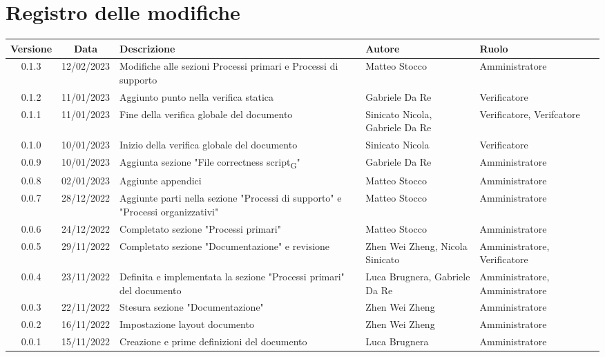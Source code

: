 \section*{Registro delle modifiche}
\begin{center}
\renewcommand\tabularxcolumn[1]{>{\Centering}m{#1}}
\begin{tabularx}{\textwidth}{| c | c | X | X | X |} 
\hline
 \textbf{Versione} & \textbf{Data} & \textbf{Descrizione} & \textbf{Autore} & \textbf{Ruolo}\\
 \hline
 0.1.3 & 12/02/2023 & Modifiche alle sezioni Processi primari e Processi di supporto & Matteo Stocco & Amministratore\\
 \hline
 0.1.2 & 11/01/2023 & Aggiunto punto nella verifica statica & Gabriele Da Re & Verificatore\\
 \hline
 0.1.1 & 11/01/2023 & Fine della verifica globale del documento & Sinicato Nicola, Gabriele Da Re & Verificatore, Verifcatore\\
 \hline
 0.1.0 & 10/01/2023 & Inizio della verifica globale del documento & Sinicato Nicola & Verificatore\\
 \hline
 0.0.9 & 10/01/2023 & Aggiunta sezione "File correctness script\textsubscript{G}" & Gabriele Da Re & Amministratore\\
 \hline
 0.0.8 & 02/01/2023 & Aggiunte appendici & Matteo Stocco & Amministratore\\
 \hline
 0.0.7 & 28/12/2022 & Aggiunte parti nella sezione "Processi di supporto" e "Processi organizzativi" & Matteo Stocco & Amministratore\\
 \hline
 0.0.6 & 24/12/2022 & Completato sezione "Processi primari" & Matteo Stocco & Amministratore\\
 \hline
 0.0.5 & 29/11/2022 & Completato sezione "Documentazione" e revisione & Zhen Wei Zheng, Nicola Sinicato & Amministratore, Verificatore\\
 \hline
 0.0.4 & 23/11/2022 &  Definita e implementata la sezione "Processi primari" del documento & Luca Brugnera, Gabriele Da Re & Amministratore, Amministratore\\
 \hline
 0.0.3 & 22/11/2022 & Stesura sezione "Documentazione" & Zhen Wei Zheng & Amministratore\\
 \hline
 0.0.2 & 16/11/2022 & Impostazione layout documento & Zhen Wei Zheng & Amministratore\\
 \hline
 0.0.1 & 15/11/2022 & Creazione e prime definizioni del documento & Luca Brugnera & Amministratore\\
 \hline
\end{tabularx}
\end{center}
